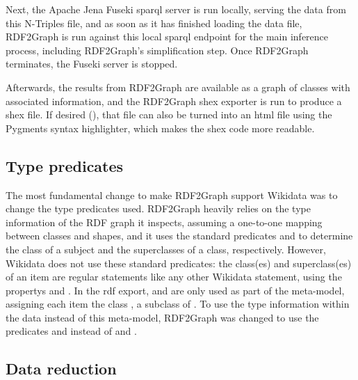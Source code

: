 Next, the Apache Jena Fuseki \gls{sparql} server is run locally,
serving the data from this N-Triples file,
and as soon as it has finished loading the data file,
\gls{RDF2Graph} is run against this local \gls{sparql} endpoint for the main inference process,
including \gls{RDF2Graph}’s simplification step.
Once \gls{RDF2Graph} terminates, the Fuseki server is stopped.

Afterwards, the results from \gls{RDF2Graph} are available as a graph of classes with associated information,
and the \gls{RDF2Graph} \gls{shex} exporter is run to produce a \gls{shex} file.
If desired (),
that file can also be turned into an \gls{html} file using the Pygments syntax highlighter,
which makes the \gls{shex} code more readable.


\subsection{Type predicates}
\label{subsec:RDF2Graph+Wikidata:Wikidata:predicates}

The most fundamental change to make \gls{RDF2Graph} support \gls{Wikidata}
was %
to change the type predicates used.
\gls{RDF2Graph} heavily relies on the type information of the RDF graph it inspects,
assuming a one-to-one mapping between classes and shapes,
and it uses the standard \glspl{predicate}  and 
to determine the class of a subject and the superclasses of a class, respectively.
However, \gls{Wikidata} does not use these standard \glspl{predicate}:
the class(es) and superclass(es) of an item
are regular \glspl{statement} like any other \gls{Wikidata} \gls{statement},
using the \glspl{property}  and .
In the \gls{rdf} export,  and  are only used
as part of the meta-model, %
assigning each item the class , a subclass of .
To use the type information within the data instead of this meta-model,
\gls{RDF2Graph} was changed to use the \glspl{predicate}  and 
instead of  and .

\subsection{Data reduction}
\label{subsec:RDF2Graph+Wikidata:Wikidata:reduction}

